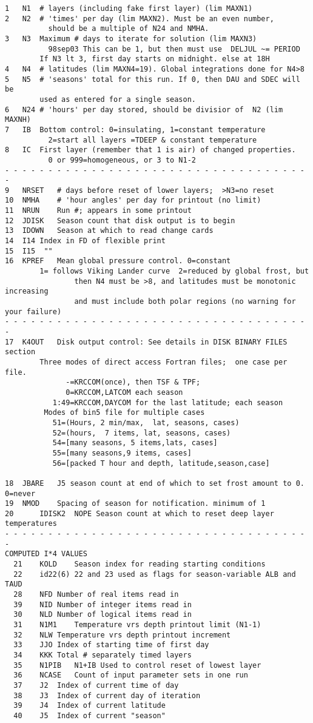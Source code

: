 \begin{verbatim}
1	N1	# layers (including fake first layer) (lim MAXN1)
2	N2	# 'times' per day (lim MAXN2). Must be an even number, 
		  should be a multiple of N24 and NMHA.
3	N3	Maximum # days to iterate for solution (lim MAXN3)
		  98sep03 This can be 1, but then must use  DELJUL ~= PERIOD
		If N3 lt 3, first day starts on midnight. else at 18H 
4	N4	# latitudes (lim MAXN4=19). Global integrations done for N4>8
5	N5	# 'seasons' total for this run. If 0, then DAU and SDEC will be 
		used as entered for a single season.
6	N24	# 'hours' per day stored, should be divisior of  N2 (lim MAXNH)
7	IB	Bottom control: 0=insulating, 1=constant temperature 
		  2=start all layers =TDEEP & constant temperature 
8	IC	First layer (remember that 1 is air) of changed properties. 
		  0 or 999=homogeneous, or 3 to N1-2 
- - - - - - - - - - - - - - - - - - - - - - - - - - - - - - - - - - - - 
9	NRSET	# days before reset of lower layers;  >N3=no reset
10	NMHA	# 'hour angles' per day for printout (no limit)
11	NRUN	Run #; appears in some printout
12	JDISK	Season count that disk output is to begin
13	IDOWN	Season at which to read change cards
14	I14	Index in FD of flexible print
15	I15	 ""
16	KPREF	Mean global pressure control. 0=constant
		1= follows Viking Lander curve  2=reduced by global frost, but
                then N4 must be >8, and latitudes must be monotonic increasing
                and must include both polar regions (no warning for your failure)
- - - - - - - - - - - - - - - - - - - - - - - - - - - - - - - - - - - - 
17	K4OUT	Disk output control: See details in DISK BINARY FILES section
		Three modes of direct access Fortran files;  one case per file.
		      -=KRCCOM(once), then TSF & TPF;
		      0=KRCCOM,LATCOM each season
		   1:49=KRCCOM,DAYCOM for the last latitude; each season
		 Modes of bin5 file for multiple cases
		   51=(Hours, 2 min/max,  lat, seasons, cases)
		   52=(hours,  7 items, lat, seasons, cases)
		   54=[many seasons, 5 items,lats, cases]
		   55=[many seasons,9 items, cases]
		   56=[packed T hour and depth, latitude,season,case]

18	JBARE	J5 season count at end of which to set frost amount to 0. 0=never
19	NMOD	Spacing of season for notification. minimum of 1
20      IDISK2  NOPE Season count at which to reset deep layer temperatures
- - - - - - - - - - - - - - - - - - - - - - - - - - - - - - - - - - - - 
COMPUTED I*4 VALUES
  21	KOLD    Season index for reading starting conditions
  22    id22(6)	22 and 23 used as flags for season-variable ALB and TAUD
  28	NFD	Number of real items read in
  39	NID	Number of integer items read in
  30	NLD	Number of logical items read in
  31	N1M1	Temperature vrs depth printout limit (N1-1)
  32	NLW	Temperature vrs depth printout increment
  33	JJO	Index of starting time of first day
  34	KKK	Total # separately timed layers
  35	N1PIB	N1+IB Used to control reset of lowest layer
  36	NCASE	Count of input parameter sets in one run
  37	J2	Index of current time of day
  38	J3	Index of current day of iteration
  39	J4	Index of current latitude
  40	J5	Index of current "season"


\end{verbatim}
